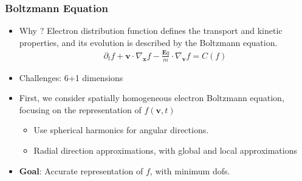 \documentclass[mathserif, aspectratio=169]{beamer}
\newcommand{\vect}[1]{\boldsymbol{#1}}
\begin{document}
\begin{frame}
	\frametitle{Boltzmann Equation}
	\begin{itemize}
		\item Why ? Electron distribution function defines the transport and kinetic properties, and its evolution is described by the Boltzmann equation.
		\begin{align}
			\partial_t f + \vect{v}\cdot \nabla_{\vect{x}} f  - \frac{\vect{E} q}{m} \cdot \nabla_{\vect{v }}f = C(f)
		\end{align}
		\item Challenges: 6+1 dimensions
		\item First, we consider spatially homogeneous electron Boltzmann equation, focusing on the representation of $f(\vect{v},t)$
		\begin{itemize}
			\item Use spherical harmonics for angular directions. 
			\item Radial direction approximations, with global and local approximations
		\end{itemize}
		\item \textbf{Goal}: Accurate representation of $f$, with minimum dofs. 
	\end{itemize}
\end{frame}
\end{document}
